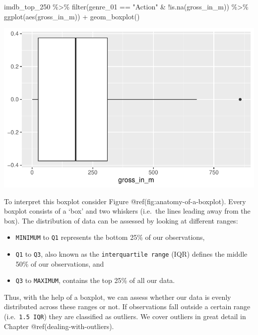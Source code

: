\documentclass[
  letterpaper,
]{krantz}
\makeatletter
\newenvironment{Shaded}{\begin{snugshade}}{\end{snugshade}}
\newcommand{\FunctionTok}[1]{\textcolor[rgb]{0.28,0.35,0.67}{#1}}
\newcommand{\NormalTok}[1]{\textcolor[rgb]{0.00,0.23,0.31}{#1}}
\newcommand{\SpecialCharTok}[1]{\textcolor[rgb]{0.37,0.37,0.37}{#1}}
\newcommand{\StringTok}[1]{\textcolor[rgb]{0.13,0.47,0.30}{#1}}
\newenvironment{kframe}{%
\medskip{}
\setlength{\fboxsep}{.8em}
 \def\at@end@of@kframe{}%
 \ifinner\ifhmode%
  \def\at@end@of@kframe{\end{minipage}}%
  \begin{minipage}{\columnwidth}%
 \fi\fi%
 \def\FrameCommand##1{\hskip\@totalleftmargin \hskip-\fboxsep
 \colorbox{shadecolor}{##1}\hskip-\fboxsep
     \hskip-\linewidth \hskip-\@totalleftmargin \hskip\columnwidth}%
 \MakeFramed {\advance\hsize-\width
   \@totalleftmargin\z@ \linewidth\hsize
   \@setminipage}}%
 {\par\unskip\endMakeFramed%
 \at@end@of@kframe}
\renewenvironment{Shaded}{\begin{kframe}}{\end{kframe}}
\makeatother
\begin{document}
\begin{Shaded}
\begin{Highlighting}[]
\NormalTok{imdb\_top\_250 }\SpecialCharTok{\%\textgreater{}\%}
  \FunctionTok{filter}\NormalTok{(genre\_01 }\SpecialCharTok{==} \StringTok{"Action"} \SpecialCharTok{\&} \SpecialCharTok{!}\FunctionTok{is.na}\NormalTok{(gross\_in\_m)) }\SpecialCharTok{\%\textgreater{}\%}
  \FunctionTok{ggplot}\NormalTok{(}\FunctionTok{aes}\NormalTok{(gross\_in\_m)) }\SpecialCharTok{+}
  \FunctionTok{geom\_boxplot}\NormalTok{()}
\end{Highlighting}
\end{Shaded}

\includegraphics{08_descriptive_statistics_files/figure-pdf/boxplot-action-movies-1.pdf}

To interpret this boxplot consider Figure
@ref(fig:anatomy-of-a-boxplot). Every boxplot consists of a `box' and
two whiskers (i.e.~the lines leading away from the box). The
distribution of data can be assessed by looking at different ranges:

\begin{itemize}
\item
  \texttt{MINIMUM} to \texttt{Q1} represents the bottom 25\% of our
  observations,
\item
  \texttt{Q1} to \texttt{Q3}, also known as the
  \texttt{interquartile\ range} (IQR) defines the middle 50\% of our
  observations, and
\item
  \texttt{Q3} to \texttt{MAXIMUM}, contains the top 25\% of all our
  data.
\end{itemize}

Thus, with the help of a boxplot, we can assess whether our data is
evenly distributed across these ranges or not. If observations fall
outside a certain range (i.e.~\texttt{1.5\ IQR}) they are classified as
outliers. We cover outliers in great detail in Chapter
@ref(dealing-with-outliers).
\end{document}
